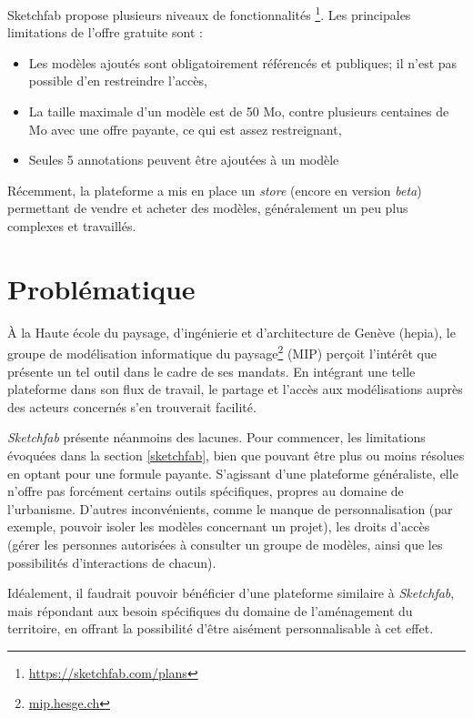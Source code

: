 Sketchfab propose plusieurs niveaux de fonctionnalités \footnote{\url{https://sketchfab.com/plans}}. Les principales limitations de l'offre gratuite sont :
\begin{itemize}
    \item Les modèles ajoutés sont obligatoirement référencés et publiques; il n'est pas possible d'en restreindre l'accès,
    \item La taille maximale d'un modèle est de 50 Mo, contre plusieurs centaines de Mo avec une offre payante, ce qui est assez restreignant,
    \item Seules 5 annotations peuvent être ajoutées à un modèle
\end{itemize}

Récemment, la plateforme a mis en place un \textit{store} (encore en version \textit{beta}) permettant de vendre et acheter des modèles, généralement un peu plus complexes et travaillés.

\section{Problématique}

À la Haute école du paysage, d'ingénierie et d'architecture de Genève (hepia), le groupe de modélisation informatique du paysage\footnote{\url{mip.hesge.ch}} (MIP) perçoit l'intérêt que présente un tel outil dans le cadre de ses mandats. En intégrant une telle plateforme dans son flux de travail, le partage et l'accès aux modélisations auprès des acteurs concernés s'en trouverait facilité.

\textit{Sketchfab} présente néanmoins des lacunes. Pour commencer, les limitations évoquées dans la section \ref{sketchfab}, bien que pouvant être plus ou moins résolues en optant pour une formule payante.
S'agissant d'une plateforme généraliste, elle n'offre pas forcément certains outils spécifiques, propres au domaine de l'urbanisme. D'autres inconvénients, comme le manque de personnalisation (par exemple, pouvoir isoler les modèles concernant un projet), les droits d'accès (gérer les personnes autorisées à consulter un groupe de modèles, ainsi que les possibilités d'interactions de chacun).



Idéalement, il faudrait pouvoir bénéficier d'une plateforme similaire à \textit{Sketchfab}, mais répondant aux besoin spécifiques du domaine de l'aménagement du territoire, en offrant la possibilité d'être aisément personnalisable à cet effet.

